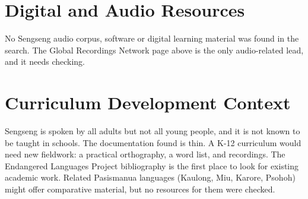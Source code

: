 \documentclass[12pt]{article}
\begin{document}
\section{Digital and Audio Resources}
No Sengseng audio corpus, software or digital learning material was found in the search. The Global Recordings Network page above is the only audio-related lead, and it needs checking.

\section{Curriculum Development Context}
Sengseng is spoken by all adults but not all young people, and it is not known to be taught in schools. The documentation found is thin. A K-12 curriculum would need new fieldwork: a practical orthography, a word list, and recordings. The Endangered Languages Project bibliography is the first place to look for existing academic work. Related Pasismanua languages (Kaulong, Miu, Karore, Psohoh) might offer comparative material, but no resources for them were checked.
\end{document}

